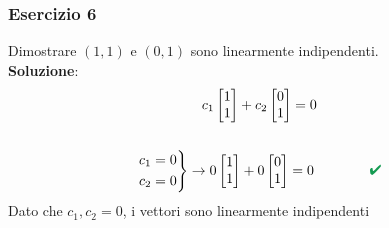 \documentclass[italian]{article}
\renewcommand{\checkmark}{\textcolor{ForestGreen}{\text{$\qquad$\ding{52}}}}
\begin{document}
\subsubsection{Esercizio 6}
Dimostrare $(1,1)$ e $(0,1)$ sono linearmente indipendenti.\\[2mm]
\textbf{Soluzione}:
\begin{gather*}
	c_1 
	\begin{bmatrix}
		1 \\ 1
	\end{bmatrix}
	+
	c_2
	\begin{bmatrix}
		0 \\ 1
	\end{bmatrix}
	= 0\\\\
	\begin{rcases*}
		c_1 = 0\\
		c_2 = 0
	\end{rcases*}
	\to
	0
	\begin{bmatrix}
		1 \\ 1
	\end{bmatrix}
	+
	0
	\begin{bmatrix}
		0 \\ 1
	\end{bmatrix}
	= 0 \qquad \checkmark
\end{gather*}
Dato che $c_1,c_2 = 0$, i vettori sono linearmente indipendenti 
\end{document}
